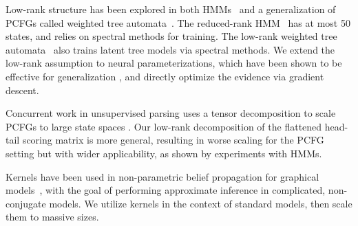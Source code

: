 \documentclass{article}
\begin{document}
Low-rank structure has been explored in both HMMs~\citep{rrhmm} and a generalization of PCFGs called weighted tree automata~\citep{rrpcfg}. The reduced-rank HMM~\citep{rrhmm} has at most 50 states, and relies on spectral methods for training.  The low-rank weighted tree automata~\citep{rrpcfg} also trains latent tree models via spectral methods. We extend the low-rank assumption to neural parameterizations, which have been shown to be effective for generalization \citep{kim2019cpcfg,chiu2020scaling}, and directly optimize the evidence via gradient descent.

Concurrent work in unsupervised parsing uses a tensor decomposition to scale PCFGs to large state spaces \citep{yang2021pcfgs}. Our low-rank decomposition of the flattened head-tail scoring matrix is more general, resulting in worse scaling for the PCFG setting but with wider applicability, as shown by experiments with HMMs.%

Kernels have been used in non-parametric belief propagation for graphical models~\citep{song2011kernelbp,song2010kernelhmm,song2011kerneltree}, with the goal of performing approximate inference in complicated, non-conjugate models.
We utilize kernels in the context of standard models, then scale them to massive sizes.




\end{document}
